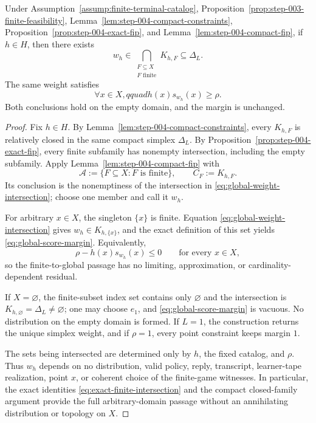 \begin{proposition}
\label{prop:step-004-global-weight}
Under Assumption~\ref{assump:finite-terminal-catalog},
Proposition~\ref{prop:step-003-finite-feasibility},
Lemma~\ref{lem:step-004-compact-constraints},
Proposition~\ref{prop:step-004-exact-fip}, and
Lemma~\ref{lem:step-004-compact-fip}, if $h\in H$, then there exists
\begin{equation}\label{eq:global-weight-intersection}
w_h\in
\bigcap_{\substack{F\subseteq X\\F\text{ finite}}}K_{h,F}
\subseteq\Delta_L.
\end{equation}
The same weight satisfies
\begin{equation}\label{eq:global-score-margin}
\forall x\in X,qquad h(x)s_{w_h}(x)\ge\rho.
\end{equation}
Both conclusions hold on the empty domain, and the margin is unchanged.
\end{proposition}

\begin{proof}
Fix $h\in H$.  By Lemma~\ref{lem:step-004-compact-constraints}, every
$K_{h,F}$ is relatively closed in the same compact simplex $\Delta_L$.
By Proposition~\ref{prop:step-004-exact-fip}, every finite subfamily has
nonempty intersection, including the empty subfamily.  Apply
Lemma~\ref{lem:step-004-compact-fip} with
\[
\mathcal A:=\{F\subseteq X:F\text{ is finite}\},
\qquad C_F:=K_{h,F}.
\]
Its conclusion is the nonemptiness of the intersection in
\eqref{eq:global-weight-intersection}; choose one member and call it $w_h$.

For arbitrary $x\in X$, the singleton $\{x\}$ is finite.  Equation
\eqref{eq:global-weight-intersection} gives
$w_h\in K_{h,\{x\}}$, and the exact definition of this set yields
\eqref{eq:global-score-margin}.  Equivalently,
\[
\rho-h(x)s_{w_h}(x)\le0
\qquad\text{for every }x\in X,
\]
so the finite-to-global passage has no limiting, approximation, or
cardinality-dependent residual.

If $X=\varnothing$, the finite-subset index set contains only
$\varnothing$ and the intersection is
$K_{h,\varnothing}=\Delta_L\ne\varnothing$; one may choose $e_1$, and
\eqref{eq:global-score-margin} is vacuous.  No distribution on the empty
domain is formed.  If $L=1$, the construction returns the unique simplex
weight, and if $\rho=1$, every point constraint keeps margin $1$.

The sets being intersected are determined only by $h$, the fixed catalog,
and $\rho$.  Thus $w_h$ depends on no distribution, valid policy, reply,
transcript, learner-tape realization, point $x$, or coherent choice of the
finite-game witnesses.  In particular, the exact identities
\eqref{eq:exact-finite-intersection} and the compact closed-family argument
provide the full arbitrary-domain passage without an annihilating
distribution or topology on $X$.
\end{proof}

